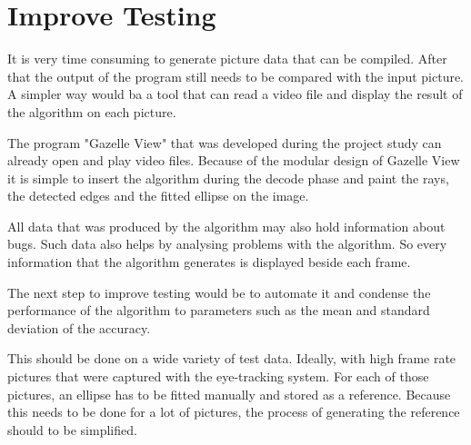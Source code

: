 \section{Improve Testing}
\label{sec:improveTesting}
It is very time consuming to generate picture data that can be compiled. After that the output of the program still needs to be compared with the input picture. A simpler way would ba a tool that can read a video file and display the result of the algorithm on each picture.

The program "Gazelle View" that was developed during the project study can already open and play video files. Because of the modular design of Gazelle View it is simple to insert the algorithm during the decode phase and paint the rays, the detected edges and the fitted ellipse on the image.

All data that was produced by the algorithm may also hold information about bugs. Such data also helps by analysing problems with the algorithm.
So every information that the algorithm generates is displayed beside each frame.

The next step to improve testing would be to automate it and condense the performance of the algorithm to parameters such as the mean and standard deviation of the accuracy.

This should be done on a wide variety of test data. Ideally, with high frame rate pictures that were captured with the eye-tracking system. For each of those pictures, an ellipse has to be fitted manually and stored as a reference. Because this needs to be done for a lot of pictures, the process of generating the reference should to be simplified.

